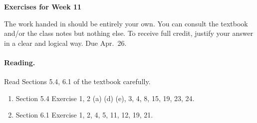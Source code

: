 \documentclass[11pt]{article}
\theoremstyle{plain}
\theoremstyle{definition}
\begin{document}
\begin{center}
{\Large \bf Exercises for Week 11}
\end{center}
The work handed in should be entirely your own. You can consult the textbook and/or the class notes but nothing else. To receive full credit, justify your answer in a clear and logical way. Due Apr.~26.

\paragraph{Reading.} Read Sections 5.4, 6.1 of the textbook carefully.

\begin{enumerate}
\item Section 5.4 Exercise 1, 2 (a) (d) (e), 3, 4, 8, 15, 19, 23, 24.
\item Section 6.1 Exercise 1, 2, 4, 5, 11, 12, 19, 21.
\end{enumerate}
\end{document}

